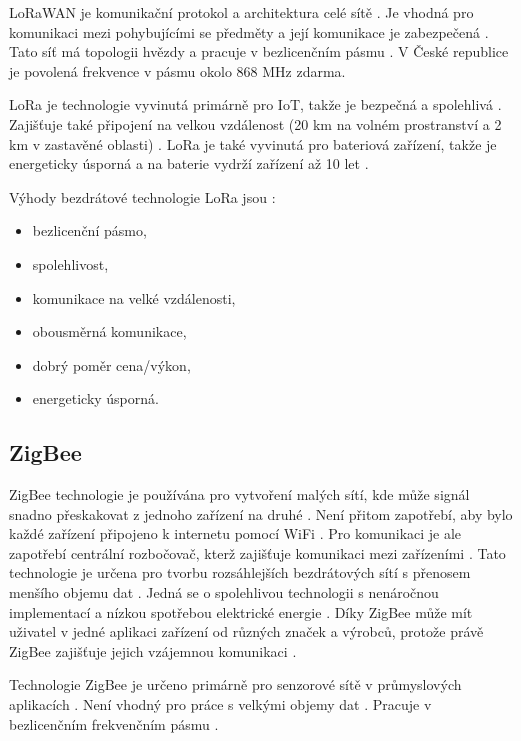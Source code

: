 LoRaWAN je komunikační protokol a architektura celé sítě \cite{LoRa_eman}. Je vhodná pro komunikaci mezi pohybujícími se předměty a její komunikace je 
zabezpečená \cite{LoRa_eman}. Tato síť má topologii hvězdy a pracuje v bezlicenčním pásmu \cite{LoRa_eman}. V České republice je povolená frekvence v pásmu 
okolo 868 MHz zdarma.

LoRa je technologie vyvinutá primárně pro IoT, takže je bezpečná a spolehlivá \cite{LoRa_IoT_PORT}. Zajišťuje také připojení na velkou vzdálenost (20 km na 
volném prostranství a 2 km v zastavěné oblasti) \cite{LoRa_IoT_PORT}. LoRa je také vyvinutá pro bateriová zařízení, takže je energeticky úsporná a na baterie
 vydrží zařízení až 10 let \cite{LoRa_IoT_PORT}.

Výhody bezdrátové technologie LoRa jsou \cite{LoRa_IoT_PORT}:
\begin{itemize}
  \item bezlicenční pásmo,
  \item spolehlivost,
  \item komunikace na velké vzdálenosti,
  \item obousměrná komunikace,
  \item dobrý poměr cena/výkon,
  \item energeticky úsporná.
\end{itemize}


\subsection{ZigBee}
ZigBee technologie je používána pro vytvoření malých sítí, kde může signál snadno přeskakovat z jednoho zařízení na druhé \cite{ZigBee_smart}.
Není přitom zapotřebí, aby bylo každé zařízení připojeno k internetu pomocí WiFi \cite{ZigBee_smart}. Pro komunikaci je ale zapotřebí centrální 
rozbočovač, kterž zajišťuje komunikaci mezi zařízeními \cite{ZigBee_smart}. Tato technologie je určena pro tvorbu rozsáhlejších bezdrátových sítí
s přenosem menšího objemu dat \cite{ZigBee_smart}. Jedná se o spolehlivou technologii s nenáročnou implementací a nízkou spotřebou elektrické energie 
\cite{ZigBee_smart}. Díky ZigBee může mít uživatel v jedné aplikaci zařízení 
od různých značek a výrobců, protože právě ZigBee zajišťuje jejich vzájemnou komunikaci \cite{ZigBee_smart}.

Technologie ZigBee je určeno primárně pro senzorové sítě v průmyslových aplikacích \cite{Bezdrat_muni}. Není vhodný pro práce s velkými objemy dat \cite{Bezdrat_muni}.
Pracuje v bezlicenčním frekvenčním pásmu \cite{Bezdrat_muni}.

